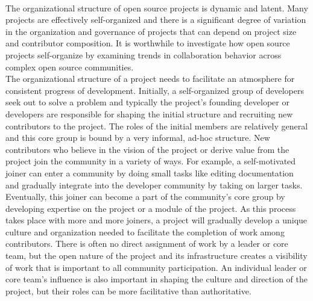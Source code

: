 \\
\noindent The organizational structure of open source projects is dynamic and latent. Many projects are effectively self-organized and there is a significant degree of variation in the organization and governance of projects that can depend on project size and contributor composition. It is worthwhile to investigate how open source projects self-organize by examining trends in collaboration behavior across complex open source communities.\\

\noindent The organizational structure of a project needs to facilitate an atmosphere for consistent progress of development. Initially, a self-organized group of developers seek out to solve a problem and typically the project's founding developer or developers are responsible for shaping the initial structure and recruiting new contributors to the project. The roles of the initial members are relatively general and this core group is bound by a very informal, ad-hoc structure. New contributors who believe in the vision of the project or derive value from the project join the community in a variety of ways. For example, a self-motivated joiner can enter a community by doing small tasks like editing documentation and gradually integrate into the developer community by taking on larger tasks. Eventually, this joiner can become a part of the community's core group by developing expertise on the project or a module of the project. As this process takes place with more and more joiners, a project will gradually develop a unique culture and organization needed to facilitate the completion of work among contributors. There is often no direct assignment of work by a leader or core team, but the open nature of the project and its infrastructure creates a visibility of work that is important to all community participation. An individual leader or core team's influence is also important in shaping the culture and direction of the project, but their roles can be more facilitative than authoritative.
